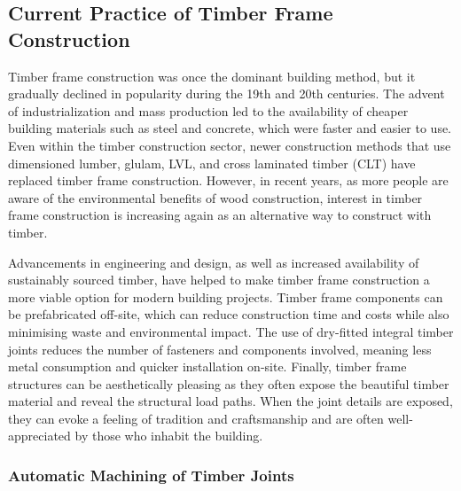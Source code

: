 \documentclass[11pt]{book}
\begin{document}
\subsection{Current Practice of Timber Frame Construction}

Timber frame construction was once the dominant building method, but it gradually declined in popularity during the 19th and 20th centuries. The advent of industrialization and mass production led to the availability of cheaper building materials such as steel and concrete, which were faster and easier to use. Even within the timber construction sector, newer construction methods that use dimensioned lumber, glulam, LVL, and cross laminated timber (CLT) have replaced timber frame construction. However, in recent years, as more people are aware of the environmental benefits of wood construction, interest in timber frame construction is increasing again as an alternative way to construct with timber. 

Advancements in engineering and design, as well as increased availability of sustainably sourced timber, have helped to make timber frame construction a more viable option for modern building projects. Timber frame components can be prefabricated off-site, which can reduce construction time and costs while also minimising waste and environmental impact. The use of dry-fitted integral timber joints reduces the number of fasteners and components involved, meaning less metal consumption and quicker installation on-site. Finally, timber frame structures can be aesthetically pleasing as they often expose the beautiful timber material and reveal the structural load paths. When the joint details are exposed, they can evoke a feeling of tradition and craftsmanship and are often well-appreciated by those who inhabit the building.

\subsubsection{Automatic Machining of Timber Joints}
\end{document}
